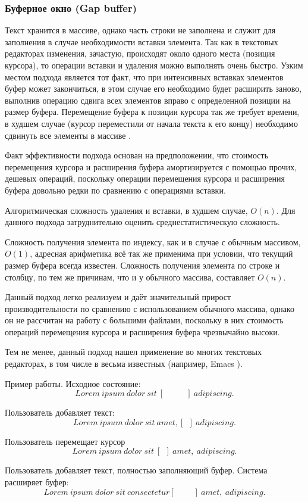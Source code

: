 \documentclass{fefu}
\begin{document}
			\subsubsection{Буферное окно (Gap buffer)}
				\par Текст хранится в массиве, однако часть строки не заполнена и служит для
				заполнения в случае необходимости вставки элемента. Так как в текстовых
				редакторах изменения, зачастую, происходят около одного места (позиция 
				курсора), то операции вставки и удаления можно выполнять очень быстро.
				Узким местом подхода является тот факт, что при интенсивных вставках элементов
				буфер может закончиться, в этом случае его необходимо будет расширить заново,
				выполнив операцию сдвига всех элементов вправо с определенной позиции на размер
				буфера. Перемещение буфера к позиции курсора так же требует времени, в худшем 
				случае (курсор переместили от начала текста к его концу) необходимо сдвинуть
				все элементы в массиве \cite{GapBufferArticle}.
				\par Факт эффективности подхода основан на предположении, что стоимость
				перемещения курсора и расширения буфера амортизируется с помощью прочих,
				дешевых операций, поскольку операции перемещения курсора и расширения буфера
				довольно редки по сравнению с операциями вставки.
				\par Алгоритмическая сложность удаления и вставки, в худшем случае, $O(n)$. Для
				данного подхода затруднительно оценить среднестатистическую сложность.
				\par Сложность получения элемента по индексу, как и в случае с обычным 
				массивом, $O(1)$, адресная арифметика всё так же применима при условии, что
				текущий размер буфера всегда известен. Сложность получения элемента по строке и
				столбцу, по тем же причинам, что и у обычного массива, составляет $O(n)$.
				\par Данный подход легко реализуем и даёт значительный прирост
				производительности по сравнению с использованием обычного массива, однако он не
				рассчитан на работу с большими файлами, поскольку в них стоимость операций 
				перемещения курсора и расширения буфера чрезвычайно высоки.
				\par Тем не менее, данный подход нашел применение во многих текстовых
				редакторах, в том числе в весьма известных (например, Emacs
				\cite{EmacsGapBuffer}). %
				\par Пример работы. Исходное состояние:
				$$Lorem~ipsum~dolor~sit~[~~~~~~~~~~~~]~adipiscing.$$
				\par Пользователь добавляет текст:
				$$Lorem~ipsum~dolor~sit~amet,[~~]~adipiscing.$$
				\par Пользователь перемещает курсор
				$$Lorem~ipsum~dolor~sit~[~~]~amet,~adipiscing.$$
				\par Пользователь добавляет текст, полностью заполняющий буфер. Система
				расширяет буфер:
				$$Lorem~ipsum~dolor~sit~consectetur[~~~~~~~~~~]~amet,~adipiscing.$$
\end{document}

